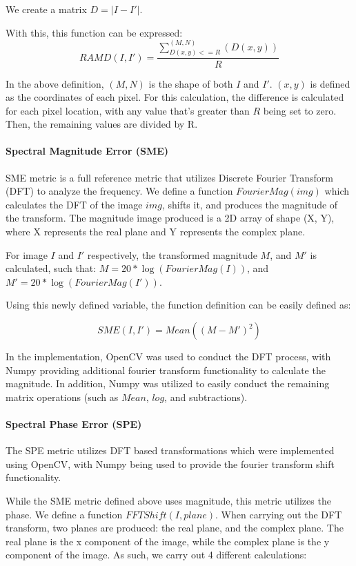 \documentclass[12pt,a4paper]{article}
\begin{document}
                We create a matrix $D = |I - I'|$.

                With this, this function can be expressed: $$RAMD(I, I') = \frac{\sum_{D(x, y) <= R}^{(M, N)}(D(x, y))}{R}$$

                In the above definition, $(M, N)$ is the shape of both $I$ and $I'$. $(x, y)$ is defined as the coordinates of each pixel. For this calculation,
                the difference is calculated for each pixel location, with any value that's greater than $R$ being set to zero. Then, the remaining values are divided by R.

            \paragraph{Spectral Magnitude Error (SME)}
                SME metric is a full reference metric that utilizes Discrete Fourier Transform (DFT) to analyze the frequency.
                We define a function $FourierMag(img)$ which calculates the DFT of the image $img$, shifts it, and produces the magnitude of the transform. The magnitude image produced
                is a 2D array of shape (X, Y), where X represents the real plane and Y represents the complex plane.

                For image $I$ and $I'$ respectively, the transformed magnitude $M$, and $M'$ is calculated, such that:
                $M = 20*\log(FourierMag(I))$, and $M' = 20 * \log(FourierMag(I'))$.

                Using this newly defined variable, the function definition can be easily defined as:

                $$SME(I, I') = Mean((M - M')^2)$$

                In the implementation, OpenCV was used to conduct the DFT process, with Numpy providing additional fourier transform functionality to calculate the magnitude. In addition, Numpy
                was utilized to easily conduct the remaining matrix operations (such as $Mean$, $log$, and subtractions).
          
            \paragraph{Spectral Phase Error (SPE)}
                The SPE metric utilizes DFT based transformations which were implemented using OpenCV, with Numpy being used to provide the fourier transform shift functionality.

                While the SME metric defined above uses magnitude, this metric utilizes the phase. We define a function $FFTShift(I, plane)$. When carrying out the DFT transform,
                two planes are produced: the real plane, and the complex plane. The real plane is the x component of the image, while the complex plane is the y component of the image.
                As such, we carry out 4 different calculations:
\end{document}
